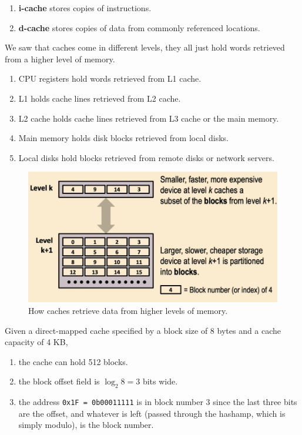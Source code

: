 \documentclass{article}
\begin{document}
\begin{definition}
\begin{enumerate}
          \item \textbf{i-cache} stores copies of instructions. 
          \item \textbf{d-cache} stores copies of data from commonly referenced locations. 
        \end{enumerate}
        We saw that caches come in different levels, they all just hold words retrieved from a higher level of memory. 
        \begin{enumerate}
          \item CPU registers hold words retrieved from L1 cache. 
          \item L1 holds cache lines retrieved from L2 cache. 
          \item L2 cache holds cache lines retrieved from L3 cache or the main memory.  
          \item Main memory holds disk blocks retrieved from local disks. 
          \item Local disks hold blocks retrieved from remote disks or network servers. 
        \end{enumerate}

        \begin{figure}[H]
          \centering 
          \includegraphics[scale=0.4]{img/cache_retrieve.png}
          \caption{How caches retrieve data from higher levels of memory.} 
          \label{fig:cache_retrieve}
        \end{figure}
      \end{definition}

      \begin{example}
        Given a direct-mapped cache specified by a block size of 8 bytes and a cache capacity of 4 KB, 
        \begin{enumerate}
          \item the cache can hold 512 blocks. 
          \item the block offset field is $\log_2 8 = 3$ bits wide. 
          \item the address \texttt{0x1F = 0b00011111} is in block number $3$ since the last three bits are the offset, and whatever is left (passed through the hashamp, which is simply modulo), is the block number. 
        \end{enumerate}
      \end{example}
\end{document}
